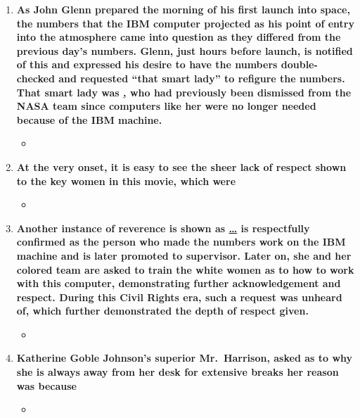 \documentclass[12pt,a4paper]{article}
\begin{document}
  \clearpage
  \begin{center}
    \large{}
  \end{center}
  \begin{enumerate}
    \item \textbf{As John Glenn prepared the morning of his first launch into space, the numbers that the IBM computer projected as his point of entry into the atmosphere came into question as they differed from the previous day's numbers. Glenn, just hours before launch, is notified of this and expressed his desire to have the numbers double-checked and requested ``that smart lady'' to refigure the numbers. That smart lady was \underline, who had previously been dismissed from the NASA team since computers like her were no longer needed because of the IBM machine.}
    \begin{itemize}
      \item {}
    \end{itemize}
    \item \textbf{At the very onset, it is easy to see the sheer lack of respect shown to the key women in this movie, which were\:}
    \begin{itemize}
      \item {}
    \end{itemize}
    \item \textbf{Another instance of reverence is shown as \underline{\ldots} is respectfully confirmed as the person who made the numbers work on the IBM machine and is later promoted to supervisor. Later on, she and her colored team are asked to train the white women as to how to work with this computer, demonstrating further acknowledgement and respect. During this Civil Rights era, such a request was unheard of, which further demonstrated the depth of respect given.}
    \begin{itemize}
      \item {}
    \end{itemize}
    \item \textbf{Katherine Goble Johnson's superior Mr.\ Harrison, asked as to why she is always away from her desk for extensive breaks her reason was because\:}
    \begin{itemize}
      \item {}
    \end{itemize}

\end{enumerate}
\end{document}
